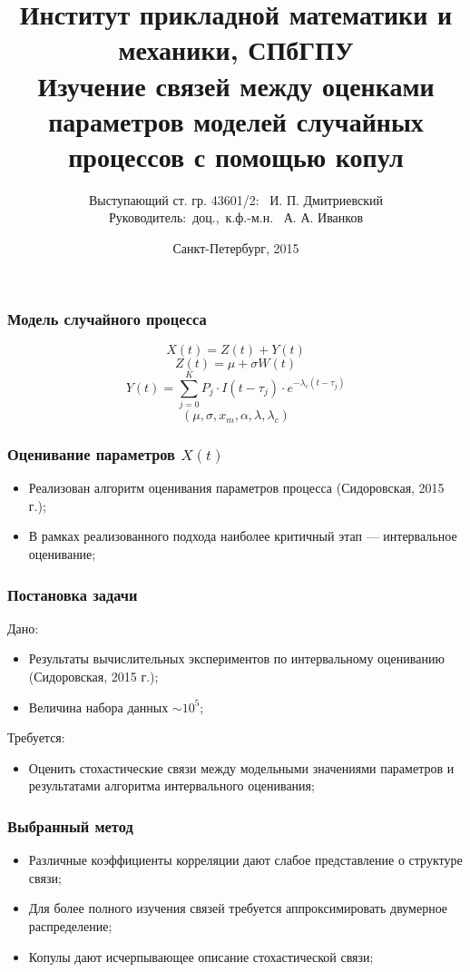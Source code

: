 \documentclass[11pt]{beamer}
\title{\small{Институт прикладной математики и механики, СПбГПУ\\%
Изучение связей между оценками параметров моделей случайных процессов с помощью копул}}
\author{\small{%
Выступающий ст. гр. 43601/2: \hfill ~И. П. Дмитриевский\\%
Руководитель:~доц.,~к.ф.-м.н. \hfill ~А. А. Иванков}\\%
\vfill
}
\date{\small{Санкт-Петербург, 2015}}
\begin{document}
\maketitle

\begin{frame}
\frametitle{Модель случайного процесса}
\begin{equation}
X(t) = Z(t) + Y(t)
\end{equation}
\begin{equation}
Z(t) = \mu + \sigma W(t)
\end{equation}
\begin{equation}
Y(t) = \sum_{j=0}^K P_j \cdot I(t - \tau_j) \cdot e^{-\lambda_c(t - \tau_j)}
\end{equation}
\begin{equation}
(\mu, \sigma, x_m, \alpha, \lambda, \lambda_c)
\end{equation}
\end{frame}

\begin{frame}
\frametitle{Оценивание параметров $X(t)$}
\begin{itemize}
  \item Реализован алгоритм оценивания параметров процесса (Сидоровская, 2015 г.);
  \item В рамках реализованного подхода наиболее критичный этап --- интервальное оценивание;
\end{itemize}
\end{frame}

\begin{frame}
\frametitle{Постановка задачи}
Дано:
\begin{itemize}
  \item Результаты вычислительных экспериментов по интервальному оцениванию (Сидоровская, 2015 г.);
  \item Величина набора данных $\sim 10^5$;
\end{itemize}

Требуется:
\begin{itemize}
  \item Оценить стохастические связи между модельными значениями параметров и результатами алгоритма интервального оценивания;
\end{itemize}
\end{frame}

\begin{frame}
\frametitle{Выбранный метод}
\begin{itemize}
  \item Различные коэффициенты корреляции дают слабое представление о структуре связи;
  \item Для более полного изучения связей требуется аппроксимировать двумерное распределение;
  \item Копулы дают исчерпывающее описание стохастической связи;
\end{itemize}
\end{frame}
\end{document}
